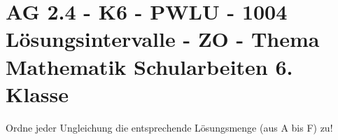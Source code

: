 \section{AG 2.4 - K6 - PWLU - 1004 Lösungsintervalle - ZO - Thema Mathematik Schularbeiten 6. Klasse}

\begin{beispiel}[K6 - PWLU]{1} %
			Ordne jeder Ungleichung die entsprechende Lösungsmenge (aus A bis F) zu!\leer
			
			\end{beispiel}
